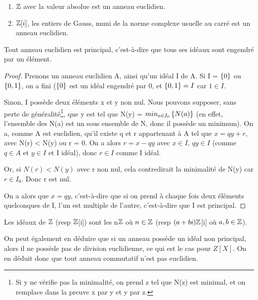 \begin{exemple}
	\begin{enumerate}
		\item $\mathbb{Z}$ avec la valeur absolue est un anneau euclidien.
		\item $\mathbb{Z}[i]$, les entiers de Gauss, muni de la norme complexe
			usuelle au carré est un anneau euclidien.
	\end{enumerate}
\end{exemple}

\begin{proposition}
	Tout anneau euclidien est principal, c'est-à-dire que tous ses idéaux sont
	engendré par un élément.
	\label{euclidian_implies_principal}
\end{proposition}

\ifdefined\outputproof
\begin{proof}
	Prenons un anneau euclidien A, ainsi qu'un idéal I de A. Si I = $\left\{0 \right\}$
	ou $\left\{0, 1 \right\}$, on a fini ($\left\{0 \right\}$ est un idéal engendré par 0, et
	$\left\{0, 1 \right\} = I$ car $1 \in I$.

	Sinon, I possède deux éléments x et y non nul. Nous pouvons supposer, sans
	perte de généralité\footnote{Si y ne vérifie pas la minimalité, on prend z
	tel que N(z) est minimal, et on remplace dans la preuve x par y et y par
z.}, que y est tel que N(y) = $\displaystyle min_{a \in I_{0}} \left\{N(a) \right\}$ (en
effet, l'ensemble des N(a) est un sous ensemble de N, donc il possède un
minimum).  On a, comme A est euclidien, qu'il existe q et r appartenant à A tel
que $x
	= qy + r$, avec N(r) < N(y) ou r = 0.
	On a alors $r = x - qy$ avec $x \in I$, $qy \in I$ (comme $q \in A$ et $y
	\in I$ et I idéal), donc $r \in I$ comme I idéal.

	Or, si $N(r) < N(y)$ avec r non nul, cela contredirait la minimalité de N(y)
	car $r \in I_{0}$. Donc r est nul.

	On a alors que $x = qy$, c'est-à-dire que si on prend à chaque fois deux
	éléments quelconques de I, l'un est multiple de l'autre, c'est-à-dire que
	I est principal.
\end{proof}
\fi

\begin{corollary}
	Les idéaux de $\mathbb{Z}$ (resp $\mathbb{Z}$[i]) sont les n$\mathbb{Z}$ où $n \in
	\mathbb{Z}$ (resp $(a+bi) \mathbb{Z}$[i] où $a, b \in \mathbb{Z}$).
\end{corollary}

On peut également en déduire que si un anneau possède un idéal non principal,
alors il ne possède pas de division euclidienne, ce qui est le cas pour $Z[X]$.
On en déduit donc que tout anneau commutatif n'est pas euclidien.

